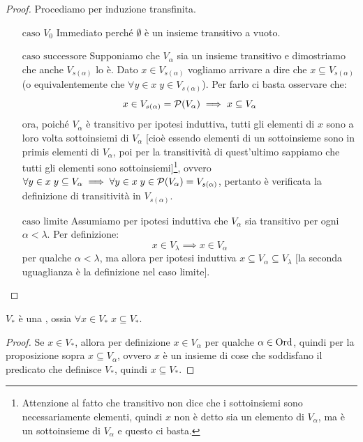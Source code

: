 \begin{proof}
	Procediamo per induzione transfinita.
	\begin{itemize}
		\item[$\boxed{\text{caso $V_0$}}$] Immediato perché $\emptyset$ è un insieme transitivo a vuoto.
		\item[$\boxed{\text{caso successore}}$] Supponiamo che $V_\alpha$ sia un insieme transitivo e dimostriamo che
		anche $V_{s(\alpha)}$ lo è. Dato $x \in V_{s(\alpha)}$ vogliamo arrivare a dire che $x \subseteq V_{s(\alpha)}$ (o equivalentemente
		che $\forall y \in x \; y \in V_{s(\alpha)}$). Per farlo ci basta osservare che:
		\[ x \in V_{s(\alpha)} = \mathcal{P}(V_\alpha) \implies x \subseteq V_\alpha
			\]
		ora, poiché $V_\alpha$ è transitivo per ipotesi induttiva, tutti gli elementi di $x$ sono a loro volta sottoinsiemi di $V_\alpha$ [cioè essendo elementi di un sottoinsieme sono in primis elementi di $V_\alpha$, poi per la transitività
		di quest'ultimo sappiamo che tutti gli elementi sono sottoinsiemi]\footnote{Attenzione al fatto che transitivo non dice che i sottoinsiemi sono necessariamente elementi, quindi $x$ non è detto sia un elemento di $V_\alpha$, ma è un sottoinsieme
		di $V_\alpha$ e questo ci basta.}, ovvero $\forall y \in x \; y \subseteq V_\alpha \implies \forall y \in x \; y \in \mathcal{P}(V_\alpha) = V_{s(\alpha)}$, pertanto è verificata la definizione di transitività in $V_{s(\alpha)}$.
		\item[$\boxed{\text{caso limite}}$] Assumiamo per ipotesi induttiva che $V_\alpha$ sia transitivo per ogni $\alpha < \lambda$. Per definizione:
		\[ x \in V_\lambda \implies x \in V_\alpha
			\]
		per qualche $\alpha < \lambda$, ma allora per ipotesi induttiva $x \subseteq V_\alpha \subseteq V_\lambda$ [la seconda uguaglianza è la definizione nel caso limite].
	\end{itemize}
\end{proof}

\begin{corollary}
	$V_*$ è una , ossia $\forall x \in V_* \; x \subseteq V_*$.
\end{corollary}

\begin{proof}
	Se $x \in V_*$, allora per definizione $x \in V_\alpha$ per qualche $\alpha \in \operatorname{Ord}$, quindi per la proposizione sopra $x \subseteq V_\alpha$, ovvero $x$ è un insieme di cose che soddisfano il predicato che definisce $V_*$, quindi $x \subseteq V_*$.
\end{proof}

